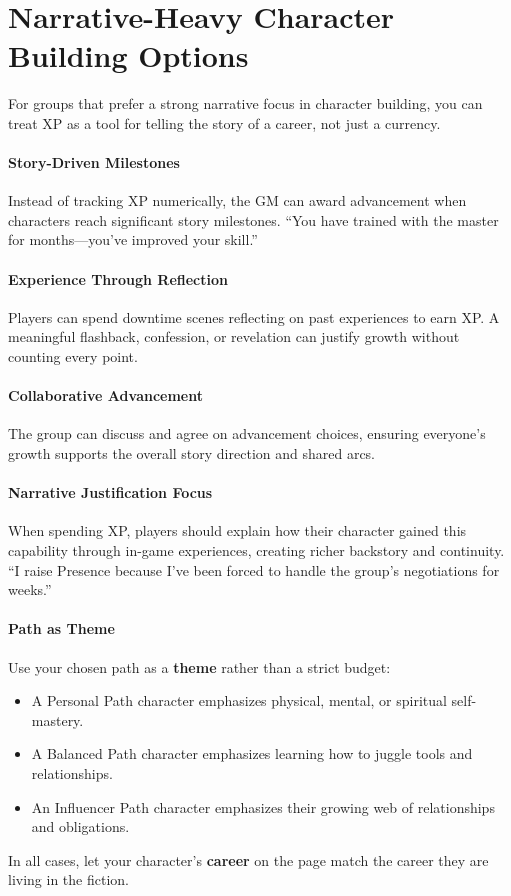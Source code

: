 \section{Narrative-Heavy Character Building Options}
\label{sec:xp-narrative}

For groups that prefer a strong narrative focus in character building, you can
treat XP as a tool for telling the story of a career, not just a currency.

\paragraph{Story-Driven Milestones}
\label{sec:xp-milestones}
Instead of tracking XP numerically, the GM can award advancement when
characters reach significant story milestones.  
``You have trained with the master for months—you've improved your skill.''

\paragraph{Experience Through Reflection}
\label{sec:xp-reflection}
Players can spend downtime scenes reflecting on past experiences to earn XP.
A meaningful flashback, confession, or revelation can justify growth without
counting every point.

\paragraph{Collaborative Advancement}
\label{sec:xp-collaborative}
The group can discuss and agree on advancement choices, ensuring everyone's
growth supports the overall story direction and shared arcs.

\paragraph{Narrative Justification Focus}
\label{sec:xp-narrative-justification}
When spending XP, players should explain how their character gained this
capability through in-game experiences, creating richer backstory and
continuity. ``I raise Presence because I've been forced to handle the group's
negotiations for weeks.''

\paragraph{Path as Theme}
\label{sec:xp-path-theme}
Use your chosen path as a \textbf{theme} rather than a strict budget:
\begin{itemize}
  \item A Personal Path character emphasizes physical, mental, or spiritual self-mastery.
  \item A Balanced Path character emphasizes learning how to juggle tools and relationships.
  \item An Influencer Path character emphasizes their growing web of relationships and obligations.
\end{itemize}

In all cases, let your character's \textbf{career} on the page match the career
they are living in the fiction.